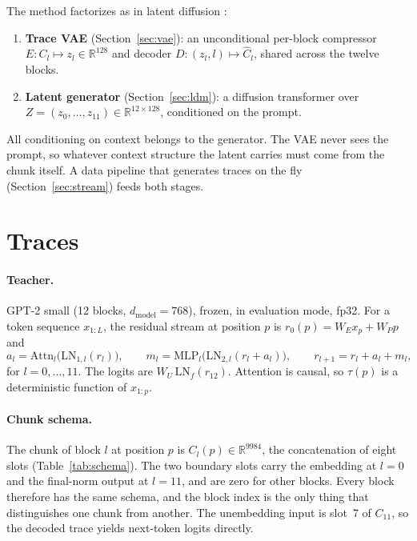 \documentclass[11pt]{article}
\newcommand{\R}{\mathbb{R}}
\newcommand{\LN}{\mathrm{LN}}
\begin{document}
The method factorizes as in latent diffusion \citep{rombach2022ldm}:
\begin{enumerate}[leftmargin=1.5em]
  \item \textbf{Trace VAE} (Section~\ref{sec:vae}): an unconditional per-block compressor
    $E: C_l \mapsto z_l \in \R^{128}$ and decoder $D:(z_l, l)\mapsto \hat C_l$, shared across the twelve blocks.
  \item \textbf{Latent generator} (Section~\ref{sec:ldm}): a diffusion transformer over $Z = (z_0,\dots,z_{11}) \in \R^{12\times128}$,
    conditioned on the prompt.
\end{enumerate}
All conditioning on context belongs to the generator. The VAE never sees the prompt, so whatever context structure the
latent carries must come from the chunk itself. A data pipeline that generates traces on the fly
(Section~\ref{sec:stream}) feeds both stages.

\section{Traces}
\label{sec:traces}

\paragraph{Teacher.} GPT-2 small (12 blocks, $d_{\text{model}} = 768$), frozen, in evaluation mode, fp32. For a token
sequence $x_{1:L}$, the residual stream at position $p$ is $r_0(p) = W_E x_p + W_P p$ and
\begin{equation}
  a_l = \mathrm{Attn}_l\big(\LN_{1,l}(r_l)\big),\qquad
  m_l = \mathrm{MLP}_l\big(\LN_{2,l}(r_l + a_l)\big),\qquad
  r_{l+1} = r_l + a_l + m_l,
\end{equation}
for $l = 0,\dots,11$. The logits are $W_U\,\LN_f(r_{12})$. Attention is causal, so $\tau(p)$ is a deterministic function of
$x_{1:p}$.

\paragraph{Chunk schema.} The chunk of block $l$ at position $p$ is $C_l(p) \in \R^{9984}$, the concatenation of eight
slots (Table~\ref{tab:schema}). The two boundary slots carry the embedding at $l = 0$ and the final-norm output at
$l = 11$, and are zero for other blocks. Every block therefore has the same schema, and the block index is the only thing
that distinguishes one chunk from another. The unembedding input is slot~7 of $C_{11}$, so the decoded trace yields
next-token logits directly.
\end{document}
